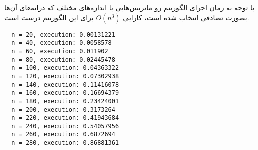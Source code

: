 \documentclass[]{article}
\begin{document}
با توجه به زمان اجرای الگوریتم رو ماتریس‌هایی با اندازه‌های مختلف که درایه‌های آن‌ها
بصورت تصادفی انتخاب شده است، کارایی $O(n^3)$ برای این الگوریتم درست است.
\begin{latin}
\begin{lstlisting}
  n = 20, execution: 0.00131221
  n = 40, execution: 0.0058578
  n = 60, execution: 0.011902
  n = 80, execution: 0.02445478
  n = 100, execution: 0.04363322
  n = 120, execution: 0.07302938
  n = 140, execution: 0.11416078
  n = 160, execution: 0.16694379
  n = 180, execution: 0.23424001
  n = 200, execution: 0.3173264
  n = 220, execution: 0.41943684
  n = 240, execution: 0.54057956
  n = 260, execution: 0.6872694
  n = 280, execution: 0.86881361
\end{lstlisting}
\end{latin}
\end{document}

